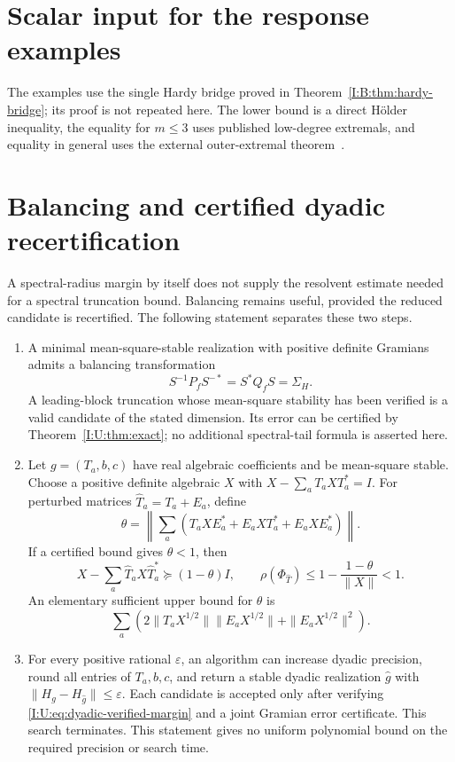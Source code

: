 
\section{Scalar input for the response examples}
\label{I:R:app:Hardy-bridge}
The examples use the single Hardy bridge proved in
Theorem~\ref{I:B:thm:hardy-bridge}; its proof is not repeated here.
The lower bound is a direct H\"older inequality, the equality for
$m\le3$ uses published low-degree extremals, and equality in general
uses the external outer-extremal theorem~\cite{outer2026}.

\section{Balancing and certified dyadic recertification}
\label{I:U:sec:dyadic-recertification}
A spectral-radius margin by itself does not supply the resolvent estimate
needed for a spectral truncation bound. Balancing remains useful, provided
the reduced candidate is recertified. The following statement separates
these two steps.

\begin{theorem}
\label{I:U:thm:dyadic-recertification}
\begin{enumerate}[label=(\roman*)]
\item A minimal mean-square-stable realization with positive definite
Gramians admits a balancing transformation
\[
 S^{-1}P_fS^{-*}=S^*Q_fS=\Sigma_H.
\]
A leading-block truncation whose mean-square stability has been verified
is a valid candidate of the stated dimension. Its error can be certified
by Theorem~\ref{I:U:thm:exact}; no additional spectral-tail formula is asserted
here.
\item Let $g=(T_a,b,c)$ have real algebraic coefficients and be
mean-square stable. Choose a positive definite algebraic $X$ with
$X-\sum_aT_aXT_a^*=I$. For perturbed matrices
$\widehat T_a=T_a+E_a$, define
\[
 \theta=\left\|\sum_a(T_aXE_a^*+E_aXT_a^*+E_aXE_a^*)\right\|.
\]
If a certified bound gives $\theta<1$, then
\begin{equation}
 X-\sum_a\widehat T_aX\widehat T_a^*\succeq(1-\theta)I,
 \qquad
 \rho(\Phi_{\widehat T})\le1-\frac{1-\theta}{\|X\|}<1.
 \label{I:U:eq:dyadic-verified-margin}
\end{equation}
An elementary sufficient upper bound for $\theta$ is
\[
 \sum_a\left(2\|T_aX^{1/2}\|\|E_aX^{1/2}\|
                         +\|E_aX^{1/2}\|^2\right).
\]
\item For every positive rational $\varepsilon$, an algorithm can
increase dyadic precision, round all entries of $T_a,b,c$, and return a
stable dyadic realization $\widehat g$ with
$\|H_g-H_{\widehat g}\|\le\varepsilon$. Each candidate is accepted
only after verifying \eqref{I:U:eq:dyadic-verified-margin} and a joint
Gramian error certificate. This search terminates. This statement gives
no uniform polynomial bound on the required precision or search time.
\end{enumerate}
\end{theorem}


